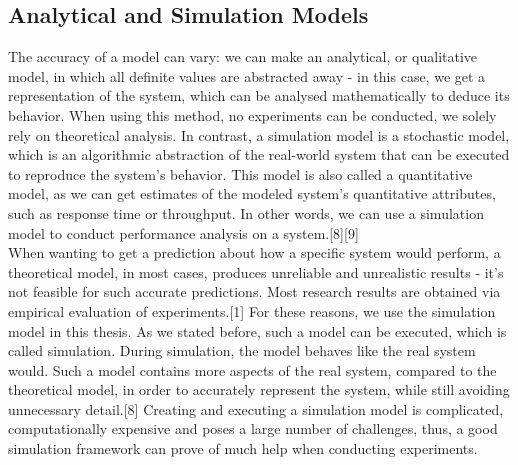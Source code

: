 \documentclass[a4paper]{article}
\begin{document}
\subsection{Analytical and Simulation Models}
The accuracy of a model can vary: we can make an analytical, or
qualitative model, in which all definite values are abstracted away -
in this case, we get a representation of
the system, which can be analysed mathematically to deduce its
behavior. When using this method, no experiments can be conducted, we
solely rely on theoretical analysis. In contrast, a simulation model
is a stochastic model, which is an algorithmic abstraction of the
real-world system that can be executed to reproduce the system's
behavior. This model is also called a quantitative model, as we can
get estimates of the modeled system's quantitative attributes, such as
response time or throughput. In other words, we can use a simulation
model to conduct performance analysis on a system.[8][9]\\
When wanting to get a prediction about how a specific system would
perform, a theoretical model, in most cases, produces unreliable and
unrealistic results - it's not feasible for such accurate
predictions. Most research results are obtained via empirical
evaluation of experiments.[1] For these reasons, we use the simulation
model in this thesis. As we stated before, such a model can be
executed, which is called simulation. During simulation, the model
behaves like the real system would. Such a model contains more aspects
of the real system, compared to the theoretical model, in order to
accurately represent the system, while still avoiding unnecessary
detail.[8] Creating and executing a simulation model is complicated,
computationally expensive and poses a large number of challenges,
thus, a good simulation framework can prove of much help when
conducting experiments.
\end{document}

